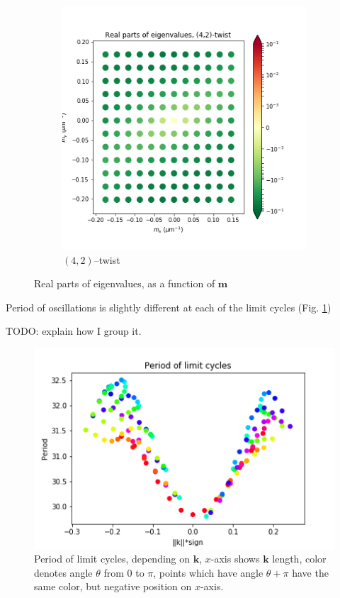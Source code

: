 \documentclass[a4paper,12pt]{article}
\renewcommand*{\vec}[1]{\mathbf{#1}}
\begin{document}
\begin{figure}[h]
\begin{subfigure}[h]{.55\textwidth}
  \includegraphics[width=.9\textwidth]{assets/theory-2019-09-05-163949584-d0f.png}
  \caption{$(4,2)$--twist}
\end{subfigure}
\caption{Real parts of eigenvalues, as a function of $\vec{m}$}
\end{figure}

Period of oscillations is slightly different at each of the limit cycles (Fig. \ref{fig:period})

TODO: explain how I group it.

\begin{figure}[h]
    \centering
    \includegraphics[width=.6\textwidth]{assets/period.png}
    \caption{Period of limit cycles, depending on $\vec{k}$, $x$-axis shows $\vec{k}$ length, color denotes angle $\theta$ from $0$ to $\pi$, points which have angle $\theta +\pi$ have the same color, but negative position on $x$-axis.}
    \label{fig:period}
\end{figure}
\end{document}
